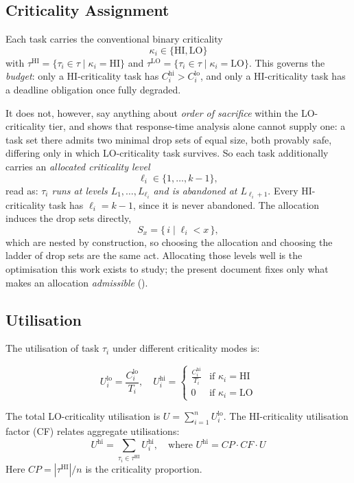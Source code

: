 \subsection{Criticality Assignment}
\label{sec:criticality-levels}

Each task carries the conventional binary criticality
\[
\kappa_i \in \{\mathrm{HI}, \mathrm{LO}\}
\]
with $\tau^{\mathrm{HI}} = \{\tau_i \in \tau \mid \kappa_i = \mathrm{HI}\}$ and
$\tau^{\mathrm{LO}} = \{\tau_i \in \tau \mid \kappa_i = \mathrm{LO}\}$. This
governs the \emph{budget}: only a HI-criticality task has
$C_i^{\mathrm{hi}} > C_i^{\mathrm{lo}}$, and only a HI-criticality task has a
deadline obligation once fully degraded.

It does not, however, say anything about \emph{order of sacrifice} within the
LO-criticality tier, and  shows that response-time analysis
alone cannot supply one: a task set there admits two minimal drop sets of equal
size, both provably safe, differing only in which LO-criticality task survives.
So each task additionally carries an \emph{allocated criticality level}
\[
\ell_i \in \{1, \dots, k-1\},
\]
read as: \emph{$\tau_i$ runs at levels $L_1, \dots, L_{\ell_i}$ and is
abandoned at $L_{\ell_i + 1}$}. Every HI-criticality task has
$\ell_i = k-1$, since it is never abandoned. The allocation induces the drop
sets directly,
\[
S_x = \{\, i \mid \ell_i < x \,\},
\]
which are nested by construction, so choosing the allocation and choosing the
ladder of drop sets are the same act. Allocating those levels well is the
optimisation this work exists to study; the present document fixes only what
makes an allocation \emph{admissible} ().

\subsection{Utilisation}

The utilisation of task $\tau_i$ under different criticality modes is:

\[
U_i^{\mathrm{lo}} = \frac{C_i^{\mathrm{lo}}}{T_i}, \quad
U_i^{\mathrm{hi}} = \begin{cases}
    \frac{C_i^{\mathrm{hi}}}{T_i} & \text{if } \kappa_i = \mathrm{HI} \\
    0 & \text{if } \kappa_i = \mathrm{LO}
\end{cases}
\]

The total LO-criticality utilisation is $U = \sum_{i=1}^n U_i^{\mathrm{lo}}$.
The HI-criticality utilisation factor (CF) relates aggregate utilisations:
\[
U^{\mathrm{hi}} = \sum_{\tau_i \in \tau^{\mathrm{HI}}} U_i^{\mathrm{hi}}, \quad
\text{where } U^{\mathrm{hi}} = CP \cdot CF \cdot U
\]
Here $CP = |\tau^{\mathrm{HI}}| / n$ is the criticality proportion.

